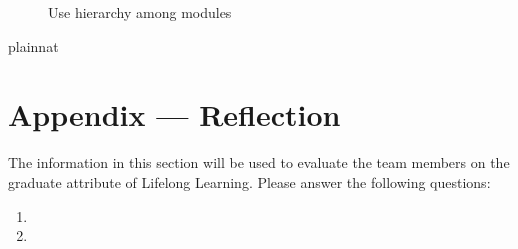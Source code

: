 \documentclass[12pt, titlepage]{article}
\begin{document}
\begin{figure}[H]
\centering
\caption{Use hierarchy among modules}
\label{FigUH}
\end{figure}


 {plainnat}


\newpage{}
\section*{Appendix --- Reflection}

The information in this section will be used to evaluate the team members on the
graduate attribute of Lifelong Learning.  Please answer the following questions:

\begin{enumerate}
  \item 
  \item 
\end{enumerate}
\end{document}
